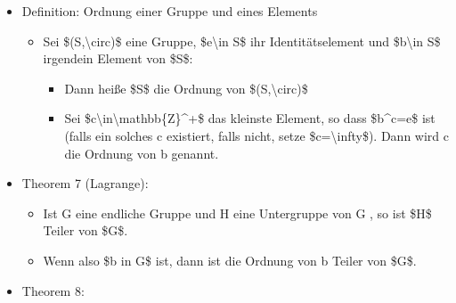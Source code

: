 \documentclass[a4paper]{article}
\begin{document}
\begin{multicols}{3}
\begin{itemize}
              \begin{itemize}
                  \item
                        Wenn \$(S,\textbackslash circ)\$ eine Gruppe ist und
                        \$b\textbackslash in S\$, dann ist \$(S',\textbackslash circ)\$ mit
                        \$S'=\{b\^{}a\textbar a\textbackslash in\textbackslash mathbb\{Z\}\^{}+\}\$
                        ebenfalls eine Gruppe.
                  \item
                        Da \$S'\textbackslash subseteq S, heißt (S',\textbackslash circ)\$
                        eine Untergruppe von \$(S,\textbackslash circ)\$
                  \item
                        Wenn b eine Urwurzel von \$(S,\textbackslash circ)\$ ist, dann ist
                        \$S'=S\$
              \end{itemize}
        \item
              Definition: Ordnung einer Gruppe und eines Elements

              \begin{itemize}
                  \item
                        Sei \$(S,\textbackslash circ)\$ eine Gruppe, \$e\textbackslash in
                        S\$ ihr Identitätselement und \$b\textbackslash in S\$ irgendein
                        Element von \$S\$:

                        \begin{itemize}
                            \item
                                  Dann heiße \$\textbar S\textbar\$ die Ordnung von
                                  \$(S,\textbackslash circ)\$
                            \item
                                  Sei \$c\textbackslash in\textbackslash mathbb\{Z\}\^{}+\$ das
                                  kleinste Element, so dass \$b\^{}c=e\$ ist (falls ein solches c
                                  existiert, falls nicht, setze \$c=\textbackslash infty\$). Dann
                                  wird c die Ordnung von b genannt.
                        \end{itemize}
              \end{itemize}
        \item
              Theorem 7 (Lagrange):

              \begin{itemize}
                  \item
                        Ist G eine endliche Gruppe und H eine Untergruppe von G , so ist
                        \$\textbar H\textbar\$ Teiler von \$\textbar G\textbar\$.
                  \item
                        Wenn also \$b in G\$ ist, dann ist die Ordnung von b Teiler von
                        \$\textbar G\textbar\$.
              \end{itemize}
        \item
              Theorem 8:


\end{itemize}
\end{multicols}
\end{document}
